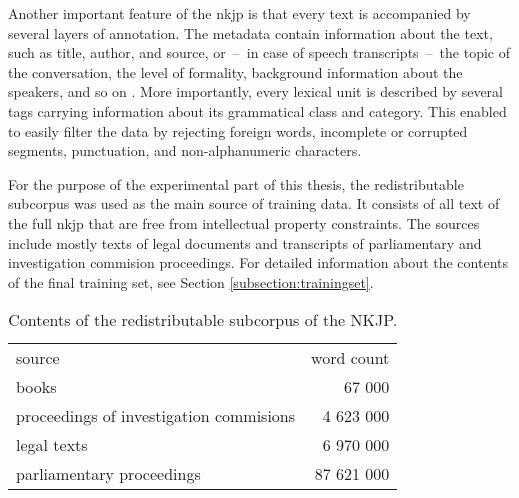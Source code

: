 Another important feature of the \gls{nkjp} is that every text is accompanied by several layers of annotation. The metadata contain information about the text, such as title, author, and source, or~--~in case of speech transcripts~--~the topic of the conversation, the level of formality, background information about the speakers, and so on \cite{przepiorkowski2009xml}. More importantly, every lexical unit is described by several tags carrying information about its grammatical class and category. This enabled to easily filter the data by rejecting foreign words, incomplete or corrupted segments, punctuation, and \mbox{non-alphanumeric} characters. 

For the purpose of the experimental part of this thesis, the redistributable subcorpus was used as the main source of training data. It consists of all text of the full \gls{nkjp} that are free from intellectual property constraints. The sources include mostly texts of legal documents and transcripts of parliamentary and investigation commision proceedings. For detailed information about the contents of the final training set, see Section \ref{subsection:trainingset}.

\begin{table}[h!]
  \begin{center}
	  \caption[Contents of the redistributable subcorpus of the NKJP]{Contents of the redistributable subcorpus of the NKJP.}
	    \label{table:freenkjp}
	    \begin{tabular*}{.6\linewidth}{@{\extracolsep{\fill}}lr}
      source & word count \\
      \cmidrule{1-2}
      books & 67 000\\
      proceedings of investigation commisions & 4 623 000\\
      legal texts & 6 970 000\\
      parliamentary proceedings & 87 621 000\\
    \end{tabular*}
  \end{center}
\end{table}

